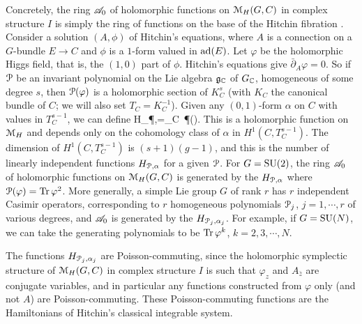 \documentclass[11pt,a4paper]{article}
\begin{document}
Concretely, the ring $\A_0$ of holomorphic functions on $\M_H(G,C)$ in complex structure $I$
is simply the ring of functions on the base of the Hitchin fibration \cite{H,NH}.
Consider a solution
$(A,\phi)$ of Hitchin's equations, where $A$ is a connection on a $G$-bundle $E\to C$ and $\phi$ is a $1$-form valued in $\ad(E)$.  Let $\varphi$ be the holomorphic
Higgs field, that is,  the $(1,0)$ part of $\phi$.  Hitchin's equations give $\bar\partial_A\varphi=0$.
So if $\P$ be  an invariant polynomial on the Lie algebra ${\g}_\C$ of
$G_\C$, homogeneous of some degree $s$, then $\P(\varphi)$ is a holomorphic section of $K_C^s$ (with $K_C$ the canonical bundle of $C$; we will
also set $T_C=K_C^{-1}$).  Given
any $(0,1)$-form $\alpha$ on $C$ with values in $T_C^{s-1}$, we can define
\be\label{juno} H_{\P,\alpha}=\int_C \alpha \,\P(\varphi). \ee
This is a holomorphic function on $\M_H$ and depends only on the cohomology class of $\alpha$ in $H^1(C,T_C^{s-1})$.
The dimension of $H^1(C,T_C^{s-1})$ is $(s+1)(g-1)$, and this is the number of linearly independent functions
$H_{\P,\alpha}$  for a given $\P$.   For $G=\SU(2)$, the ring $\A_0$ of holomorphic functions on $\M_H(G,C)$ is generated by the $H_{\P,\alpha}$
where $\P(\varphi)=\Tr\,\varphi^2$.   More generally, a simple Lie group $G$ of rank $r$ has $r$ independent Casimir operators, corresponding to $r$ 
homogeneous polynomials $\P_j$, $j=1,\cdots,r$ of various degrees,  and $\A_0$ is generated by the $H_{\P_j,\alpha_j}$.   For example, if $G=\SU(N)$, we can 
take the generating polynomials to  be $\Tr\,\varphi^{k}$, $k=2,3,\cdots,N$.   

The functions $H_{\P_j,\alpha_j}$ are Poisson-commuting, since the holomorphic symplectic structure of $\M_H(G,C)$ in complex
structure $I$ is such that $\varphi_z$ and $A_{\bar z}$ are conjugate variables, and in particular
 any functions constructed from $\varphi$ only (and not $A$) are Poisson-commuting.      These Poisson-commuting functions 
  are the Hamiltonians of Hitchin's classical integrable system.
\end{document}
